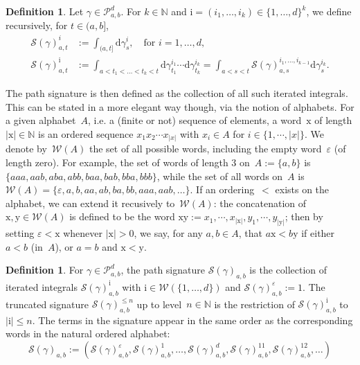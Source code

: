 \documentclass{amsart}[11pt]
\numberwithin{equation}{section}
\theoremstyle{definition}
\newtheorem{definition}[theorem]{Definition}
\newcommand{\Pp}{\mathcal{P}}
\newcommand{\ii}{\boldsymbol{\mathrm{i}}}
\newcommand{\xx}{\mathrm{x}}
\newcommand{\yy}{\mathrm{y}}
\newcommand{\Ww}{\mathcal{W}}
\newcommand{\Ss}{\mathcal{S}}
\newcommand{\NN}{\mathbb{N}}
\newcommand{\D}{\mathrm{d}}
\newcommand{\eps}{\varepsilon}
\newcommand{\Pab}{\Pp_{a,b}^{d}}
\begin{document}
\begin{definition}\label{def:k-fold-iterated-integral}
Let $\gamma\in\Pab$.
For $k \in \NN$ and $\ii = (i_1, \ldots, i_k) \in \{1, \ldots, d\}^k$, we define recursively, for $t\in (a,b]$,
\begin{align*}
\Ss(\gamma)_{a,t}^{i} & := \int_{(a,t]}\D\gamma_s^i, \quad \text{for } i=1,\ldots, d,\\
\Ss(\gamma)_{a,t}^{\ii} & :=  \int_{a < t_1 < \ldots < t_k < t} \D{\gamma_{t_1}^{i_1}} \cdots \D{\gamma_{t_k}^{i_k}} = \int_{a<s<t} \Ss(\gamma)_{a,s}^{i_1, \ldots, i_{k-1}} \D{\gamma_s^{i_k}}.
\end{align*}
\end{definition}

The path signature is then defined as the collection of all such iterated integrals.
This can be stated in a more elegant way though, via the notion of alphabets.
For a given alphabet~$A$, i.e. a (finite or not) sequence of elements,
a word~$\xx$ of length $|\xx|\in\NN$ is an ordered sequence $x_1 x_2 \cdots x_{|x|}$
with $x_i \in A$ for $i \in \{1, \cdots, |x|\}$.
We denote by~$\Ww(A)$ the set of all possible words, including the empty word~$\eps$ (of length zero).
For example, the set of words of length 3 on~$A := \{a, b\}$ is
$ \{aaa, aab, aba, abb, baa, bab, bba, bbb\} $, while
the set of all words on~$A$ is
$\Ww(A) = \{\eps, a, b, aa, ab, ba, bb, aaa, aab, \ldots\}$.
If an ordering~$<$ exists on the alphabet, we can extend it recusively to~$\Ww(A)$:
the concatenation of $\xx, \yy\in\Ww(A)$ is defined to be the word $\xx\yy := x_1,\cdots,x_{|\xx|}, y_1,\cdots,y_{|\yy|}$;
then by setting $\eps < \xx$ whenever $|\xx|>0$,
we say, for any $a, b \in A$, that $a\xx < b\yy$ if either $a < b$ (in~$A$), or $a = b$ and $\xx < \yy$.

\begin{definition}\label{def:path-signature}
For $\gamma\in\Pab$, the path signature $\Ss(\gamma)_{a,b}$ is the collection of iterated integrals
$\Ss(\gamma)_{a,b}^{\ii}$ with $\ii\in \Ww(\{1, \ldots, d\})$ and $\Ss(\gamma)_{a,b}^{\eps}:=1$.
The truncated signature $\Ss(\gamma)_{a,b}^{\leq n}$ up to level~$n\in\NN$
is the restriction of $\Ss(\gamma)_{a,b}^{\ii}$ to $|\ii|\leq n$. The terms in the signature appear in the same order as the corresponding words in the natural ordered alphabet:
$$
\Ss(\gamma)_{a,b} := \left(  \Ss(\gamma)_{a,b}^{\eps}, \Ss(\gamma)_{a,b}^{1}, \ldots, \Ss(\gamma)_{a,b}^{d}, \Ss(\gamma)_{a,b}^{11}, \Ss(\gamma)_{a,b}^{12}, \ldots \right)
$$
\end{definition}
\end{document}
